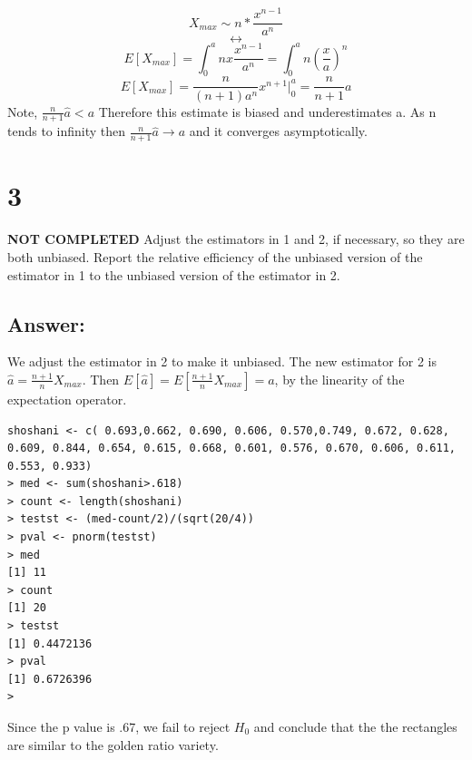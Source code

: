 \documentclass[svgnames]{article}
\begin{document}
$$X_{max}\sim n  * \frac{x^{n-1}}{a^{n}}$$
$$\leftrightarrow$$
$$E[X_{max}]= \int_{0}^{a}n x \frac{x^{n-1}}{a^n} =\int_{0}^{a} n( {\frac{x}{a}})^n$$
$$E[X_{max}]=\frac{n}{(n+1)a^n}x^{n+1}\big|^{a}_{0}=\frac{n}{n+1}a $$
Note, $\frac{n}{n+1}\hat{a}<a$ Therefore this estimate is biased and underestimates a.
As n tends to infinity then $\frac{n}{n+1}\hat{a}\rightarrow a$ and it converges asymptotically. 

\section*{3}
\textbf{NOT COMPLETED }
Adjust the estimators in 1 and 2, if necessary, so they are both unbiased. Report the relative efficiency of the unbiased version of the estimator in 1 to the unbiased version of the estimator in 2.


\subsection*{Answer:}
We adjust the estimator in 2 to make it unbiased. 
\newline
The new estimator for 2 is $\hat{a} = \frac{n+1}{n}X_{max}$. Then $E[\hat{a}]= E[\frac{n+1}{n}X_{max}] = a$, by the linearity of the expectation operator. 



\begin{lstlisting}
shoshani <- c( 0.693,0.662, 0.690, 0.606, 0.570,0.749, 0.672, 0.628, 0.609, 0.844, 0.654, 0.615, 0.668, 0.601, 0.576, 0.670, 0.606, 0.611, 0.553, 0.933)
> med <- sum(shoshani>.618)
> count <- length(shoshani)
> testst <- (med-count/2)/(sqrt(20/4))
> pval <- pnorm(testst)
> med
[1] 11
> count
[1] 20
> testst
[1] 0.4472136
> pval
[1] 0.6726396
> \end{lstlisting}

Since the p value is .67, we fail to reject $H_0$ and conclude that the the rectangles are similar to the golden ratio variety.
\end{document}
